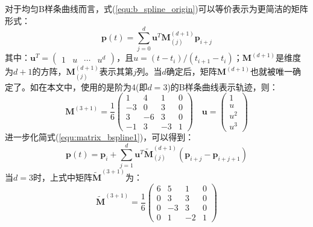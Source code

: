 \documentclass[12pt, onecolumn]{article}
\begin{document}
	
	对于均匀B样条曲线而言，式(\ref{equ:b_spline_origin})可以等价表示为更简洁的矩阵形式\cite{qin1998general}：
	\begin{equation}
	  \label{equ:matrix_bspline1}
	  \boldsymbol{p}(t)=\sum_{j=0}^{d}\boldsymbol{u}^T\boldsymbol{M}^{(d+1)}_{(j)}\boldsymbol{p}_{i+j}
	\end{equation}
	其中：$\boldsymbol{u}^T=\begin{pmatrix}
	    1 & u & \cdots & u^d
	  \end{pmatrix}$，且$u=(t-t_i)/(t_{i+1}-t_i)$；$\boldsymbol{M}^{(d+1)}$是维度为$d+1$的方阵，$\boldsymbol{M}^{(d+1)}_{(j)}$表示其第$j$列。当$d$确定后，矩阵$\boldsymbol{M}^{(d+1)}$也就被唯一确定了。如在本文中，使用的是阶为4(即$d=3$)的B样条曲线表示轨迹，则：
	\begin{equation}
	  \boldsymbol{M}^{(3+1)}=\frac{1}{6}\begin{pmatrix}
	    1  & 4  & 1  & 0 \\
	    -3 & 0  & 3  & 0 \\
	    3  & -6 & 3  & 0 \\
	    -1 & 3  & -3 & 1
	  \end{pmatrix}\quad
	  \boldsymbol{u}=\begin{pmatrix}
	    1\\{u}\\{u}^2\\{u}^3
	  \end{pmatrix}
	\end{equation}
	进一步化简式(\ref{equ:matrix_bspline1})，可以得到：
	\begin{equation}
	  \label{equ:matrix_bspline2}
	  \boldsymbol{p}(t)=\boldsymbol{p}_i+\sum_{j=1}^{d}\boldsymbol{u}^T\tilde{\boldsymbol{M}}^{(d+1)}_{(j)}(\boldsymbol{p}_{i+j}-\boldsymbol{p}_{i+j+1})
	\end{equation}
	当$d=3$时，上式中矩阵$\tilde{\boldsymbol{M}}^{(3+1)}$为：
	\begin{equation}
	  \tilde{\boldsymbol{M}}^{(3+1)}=\frac{1}{6}\begin{pmatrix}
	    6 & 5  & 1  & 0 \\
	    0 & 3  & 3  & 0 \\
	    0 & -3 & 3  & 0 \\
	    0 & 1  & -2 & 1
	  \end{pmatrix}
	\end{equation}
	
\end{document}
